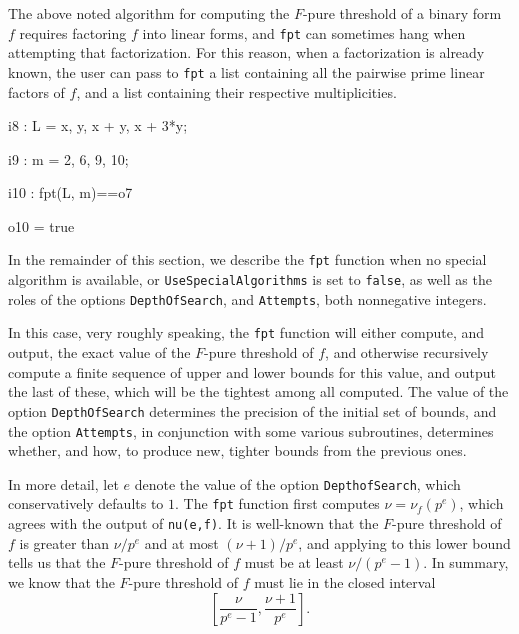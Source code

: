 \documentclass{amsart}
\begin{document}
            The above noted algorithm for computing the $F$-pure threshold of a binary form $f$ requires factoring $f$ into linear forms, and {\tt fpt} can sometimes hang when attempting that factorization. For this reason, when a factorization is already known, the user can pass to {\tt fpt} a list containing all the pairwise prime linear factors of $f$, and a list containing their respective multiplicities.

{\small
{}
\begin{MyVerbatim}

i8 : L = {x, y, x + y, x + 3*y};

i9 : m = {2, 6, 9, 10};

i10 : fpt(L, m)==o7

o10 = true

\end{MyVerbatim}
}

In the remainder of this section, we describe the {\tt fpt} function when no special algorithm is available, or {\tt UseSpecialAlgorithms} is set to {\tt false},  as well as the roles of the options {\tt DepthOfSearch}, and {\tt Attempts}, both nonnegative integers.  

In this case, very roughly speaking, the {\tt fpt} function will either compute, and output, the exact value of the $F$-pure threshold of $f$, and otherwise recursively compute a finite sequence of upper and lower bounds for this value, and output the last of these, which will be the tightest among all computed.  The value of the option {\tt DepthOfSearch} determines the precision of the initial set of bounds, and the option {\tt Attempts}, in conjunction with some various subroutines, determines whether, and how, to produce new, tighter bounds from the previous ones.  %

In more detail, let $e$ denote the value of the option {\tt DepthofSearch}, which conservatively defaults to $1$.  The {\tt fpt} function first computes $\nu=\nu_f(p^e)$, which agrees with the output of {\tt nu(e,f)}.  It is well-known that the $F$-pure threshold of $f$ is greater than $\nu/p^e$ and at most $(\nu+1)/p^e$, and applying  {\color{red} \cite[Proposition 4.2]{}} to this lower bound tells us that the $F$-pure threshold of $f$ must be at least $\nu/(p^e-1)$.  In summary, we know that the $F$-pure threshold of $f$ must lie in the closed interval 
%
\begin{equation}
\label{estimating-interval: e}
\tag{$\dagger$}
\left[ \frac{\nu}{p^e-1}, \frac{\nu+1}{p^e} \right].
\end{equation}
\end{document}
